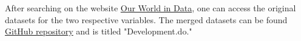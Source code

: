 \documentclass[12pt]{article}
\begin{document}
 After searching on the website  \href{https://ourworldindata.org/}{Our World in Data}, one can access the original datasets for the two respective variables. The merged datasets can be found \href{https://github.com/ecn310/course-project-developmentv}{GitHub repository} and is titled "Development.do."
\end{document}
